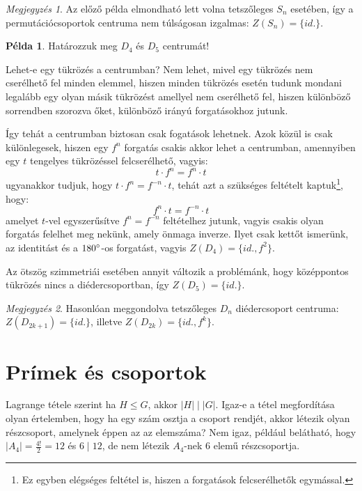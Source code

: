 \documentclass[12pt]{book}
\theoremstyle{plain} %
\theoremstyle{definition} %
\newtheorem{pl}{Példa}[section]
\theoremstyle{remark}
\newtheorem*{mj}{Megjegyzés}
\numberwithin{equation}{section}  %
\begin{document}
	\begin{mj}
		Az előző példa elmondható lett volna tetszőleges $S_n$ esetében, így a permutációcsoportok centruma nem túlságosan izgalmas: $Z(S_n) = \{id.\}$.
	\end{mj}

	\begin{pl}
		Határozzuk meg $D_4$ és $D_5$ centrumát!
		
		Lehet-e egy tükrözés a centrumban? Nem lehet, mivel egy tükrözés nem cserélhető fel minden elemmel, hiszen minden tükrözés esetén tudunk mondani legalább egy olyan másik tükrözést amellyel nem cserélhető fel, hiszen különböző sorrendben szorozva őket, különböző irányú forgatásokhoz jutunk.
		
		Így tehát a centrumban biztosan csak fogatások lehetnek. Azok közül is csak különlegesek, hiszen egy $f^n$ forgatás csakis akkor lehet a centrumban, amennyiben egy $t$ tengelyes tükrözéssel felcserélhető, vagyis:
		\[ t\cdot f^n = f^n \cdot t  \]
		ugyanakkor tudjuk, hogy $t\cdot f^n = f^{-n} \cdot t$, tehát azt a szükséges feltételt kaptuk\footnote{Ez egyben elégséges feltétel is, hiszen a forgatások felcserélhetők egymással.}, hogy:
		\[ f^n \cdot t = f^{-n} \cdot t  \]
		amelyet $t$-vel egyszerűsítve $f^n = f^{-n}$ feltételhez jutunk, vagyis csakis olyan forgatás felelhet meg nekünk, amely önmaga inverze. Ilyet csak kettőt ismerünk, az identitást és a $180\degree$-os forgatást, vagyis $Z(D_4) = \{id., f^2\}$. %
		
		Az ötszög szimmetriái esetében annyit változik a problémánk, hogy középpontos tükrözés nincs a diédercsoportban, így $Z(D_5) = \{id.\}$.	\end{pl}
	
		\begin{mj}
			Hasonlóan meggondolva tetszőleges $D_n$ diédercsoport centruma: $Z(D_{2k+1}) = \{id.\} $, illetve $Z(D_{2k}) = \{id., f^k\}$.
		\end{mj}

	
	\section{Prímek és csoportok}
	
	Lagrange tétele szerint ha $H\leq G$, akkor $|H| \mid |G|$. Igaz-e a tétel megfordítása olyan értelemben, hogy ha egy szám osztja a csoport rendjét, akkor létezik olyan részcsoport, amelynek éppen az az elemszáma? Nem igaz, például belátható, hogy $|A_4|=\frac{4!}{2} = 12$ és $6\mid 12$, de nem létezik $A_4$-nek $6$ elemű részcsoportja.
	
\end{document}
